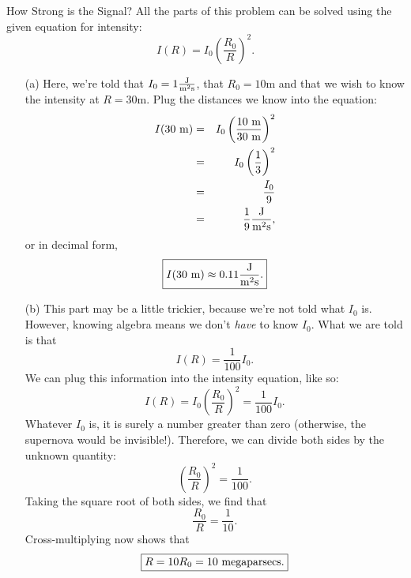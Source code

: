 \documentclass[12pt]{article}
\begin{document}
\begin{probdesc}{2}{How Strong is the Signal?}
All the parts of this problem can be solved using the given equation
for intensity:
\begin{equation}
I(R) = I_0 \left(\frac{R_0}{R}\right)^2.
\end{equation}

\begin{enumerate}
\item[(a)] Here, we're told that $I_0 = 1 \frac{\rm J}{{\rm m}^2 \rm
  s}$, that $R_0 = 10$m and that we wish to know the intensity at $R =
  30$m.  Plug the distances we know into the equation:
\begin{eqnarray}
I(30 {\rm\ m}) &=& I_0 \left(\frac{10 \rm\ m}{30 \rm\ m}\right)^2
  \nonumber\\
&=& I_0 \left(\frac{1}{3}\right)^2 \nonumber\\
&=& \frac{I_0}{9} \nonumber\\
&=& \frac{1}{9}\frac{\rm J}{{\rm m}^2 \rm s},\nonumber
\end{eqnarray}
or in decimal form,
\begin{equation}
\boxed{I(30 {\rm\ m}) \approx 0.11 \frac{\rm J}{{\rm m}^2 \rm s}.}
\end{equation}


\item[(b)] This part may be a little trickier, because we're not told
  what $I_0$ is.  However, knowing algebra means we don't {\em have}
  to know $I_0$.  What we are told is that
\begin{equation}
I(R) = \frac{1}{100} I_0.
\end{equation}
We can plug this information into the intensity equation, like so:
\begin{equation}
I(R) = I_0\left(\frac{R_0}{R}\right)^2 = \frac{1}{100} I_0.
\end{equation}
Whatever $I_0$ is, it is surely a number greater than zero (otherwise,
the supernova would be invisible!).  Therefore, we can divide both
sides by the unknown quantity:
\begin{equation}
\left(\frac{R_0}{R}\right)^2 = \frac{1}{100}.
\end{equation}
Taking the square root of both sides, we find that
\begin{equation}
\frac{R_0}{R} = \frac{1}{10}.
\end{equation}
Cross-multiplying now shows that
\begin{equation}
\boxed{R = 10R_0 = 10 \rm\ megaparsecs.}
\end{equation}
\end{enumerate}
\end{probdesc}
\end{document}
